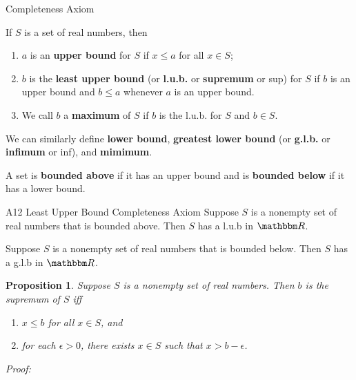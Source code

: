 \documentclass[9pt,aspectratio=169]{beamer}
\newcommand{\RR}{\mathbbm R}
\newtheorem{proposition}[theorem]{Proposition}
\begin{document}
\begin{frame}[allowframebreaks]{Completeness Axiom}
    \begin{definition}
        If $S$ is a set of real numbers, then
        \begin{enumerate}
            \item $a$ is an \textbf{upper bound} for $S$ if $x \leq a$ for
            all $x \in S$;
            \item $b$ is the \textbf{least upper bound} (or \textbf{l.u.b.} or
            \textbf{supremum} or sup) for $S$ if $b$ is an upper bound and $b
            \leq a$ whenever $a$ is an upper bound.
            \item We call $b$ a \textbf{maximum} of $S$ if $b$ is the l.u.b.
            for $S$ and $b \in S$.
        \end{enumerate}
        We can similarly define \textbf{lower bound}, \textbf{greatest lower
          bound} (or \textbf{g.l.b.} or \textbf{infimum} or inf), and
        \textbf{mimimum}.

        A set is \textbf{bounded above} if it has an upper bound and is
        \textbf{bounded below} if it has a lower bound.
    \end{definition}
    \framebreak
    \begin{block}{A12 Least Upper Bound Completeness Axiom}
        Suppose $S$ is a nonempty set of real numbers that is bounded above.
        Then $S$ has a l.u.b in $\RR$.
    \end{block}
    \begin{corollary}
        Suppose $S$ is a nonempty set of real numbers that is bounded below.
        Then $S$ has a g.l.b in $\RR$.
    \end{corollary}
    \framebreak
    \begin{proposition}
        Suppose $S$ is a nonempty set of real numbers. Then $b$ is the
        supremum of $S$ iff
        \begin{enumerate}
            \item $x \leq b$ for all $x \in S$, and
            \item for each $\epsilon > 0$, there exists $x\in S$ such that $x
            > b - \epsilon$.
        \end{enumerate}
    \end{proposition}
    \emph{Proof:}
\end{frame}
\end{document}
